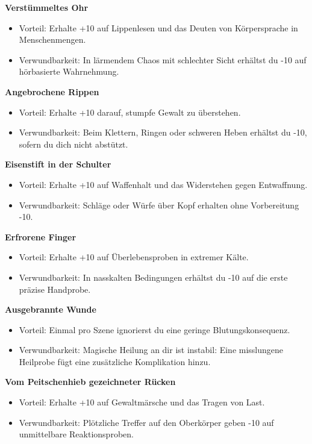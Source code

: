 \noindent\textbf{Verstümmeltes Ohr}\par
\begin{itemize}[leftmargin=*,nosep]
\item Vorteil: Erhalte +10 auf Lippenlesen und das Deuten von Körpersprache in Menschenmengen.
\item Verwundbarkeit: In lärmendem Chaos mit schlechter Sicht erhältst du -10 auf hörbasierte Wahrnehmung.
\end{itemize}
\noindent\textbf{Angebrochene Rippen}\par
\begin{itemize}[leftmargin=*,nosep]
\item Vorteil: Erhalte +10 darauf, stumpfe Gewalt zu überstehen.
\item Verwundbarkeit: Beim Klettern, Ringen oder schweren Heben erhältst du -10, sofern du dich nicht abstützt.
\end{itemize}
\noindent\textbf{Eisenstift in der Schulter}\par
\begin{itemize}[leftmargin=*,nosep]
\item Vorteil: Erhalte +10 auf Waffenhalt und das Widerstehen gegen Entwaffnung.
\item Verwundbarkeit: Schläge oder Würfe über Kopf erhalten ohne Vorbereitung -10.
\end{itemize}
\noindent\textbf{Erfrorene Finger}\par
\begin{itemize}[leftmargin=*,nosep]
\item Vorteil: Erhalte +10 auf Überlebensproben in extremer Kälte.
\item Verwundbarkeit: In nasskalten Bedingungen erhältst du -10 auf die erste präzise Handprobe.
\end{itemize}
\noindent\textbf{Ausgebrannte Wunde}\par
\begin{itemize}[leftmargin=*,nosep]
\item Vorteil: Einmal pro Szene ignorierst du eine geringe Blutungskonsequenz.
\item Verwundbarkeit: Magische Heilung an dir ist instabil: Eine misslungene Heilprobe fügt eine zusätzliche Komplikation hinzu.
\end{itemize}
\noindent\textbf{Vom Peitschenhieb gezeichneter Rücken}\par
\begin{itemize}[leftmargin=*,nosep]
\item Vorteil: Erhalte +10 auf Gewaltmärsche und das Tragen von Last.
\item Verwundbarkeit: Plötzliche Treffer auf den Oberkörper geben -10 auf unmittelbare Reaktionsproben.
\end{itemize}
